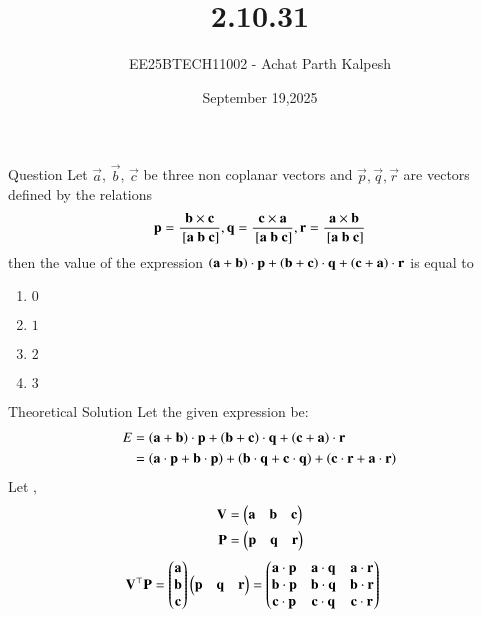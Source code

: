 \documentclass{beamer}
\title %
{2.10.31}
\date{September 19,2025}
\author %
{EE25BTECH11002 - Achat Parth Kalpesh}
\begin{document}
\frame{\titlepage}

\begin{frame}{Question}
Let $\vec{a}$, $\vec{b}$, $\vec{c}$ be three non coplanar vectors and 
$\vec{p}, \vec{q},\vec{r}$ are vectors defined by the relations 
\begin{align}
\vec{p}=\frac{\vec{b}\times\vec{c}}{\sbrak{\vec{a}\ \vec{b}\ \vec{c}}}, \vec{q}=\frac{\vec{c}\times\vec{a}}{\sbrak{\vec{a}\ \vec{b}\ \vec{c}}},\vec{r}=\frac{\vec{a}\times\vec{b}}{\sbrak{\vec{a}\ \vec{b}\ \vec{c}}}
\end{align}
then the value of the expression $\left(\mathbf{a}+\mathbf{b}\right)\cdot\mathbf{p}+\left(\mathbf{b}+\mathbf{c}\right)\cdot\mathbf{q}+\left(\mathbf{c}+\mathbf{a}\right)\cdot\mathbf{r}$ is equal to
  \begin{multicols}{2}
\begin{enumerate}
\item $0$
\item $1$
\item $2$
\item $3$
\end{enumerate}
\end{multicols}
\end{frame}
\begin{frame}{Theoretical Solution}
Let the given expression be:
\begin{align}
    E &= \left(\mathbf{a} + \mathbf{b}\right) \cdot \mathbf{p} + \left(\mathbf{b} + \mathbf{c}\right) \cdot \mathbf{q} + \left(\mathbf{c} + \mathbf{a}\right) \cdot \mathbf{r}\\
    &= \left(\mathbf{a} \cdot \mathbf{p} + \mathbf{b} \cdot \mathbf{p}\right) + \left(\mathbf{b} \cdot \mathbf{q} + \mathbf{c} \cdot \mathbf{q}\right) + \left(\mathbf{c} \cdot \mathbf{r} + \mathbf{a} \cdot \mathbf{r}\right)
\end{align}
Let ,
\begin{align}
    \mathbf{V} &= \begin{pmatrix}\mathbf{a}&\mathbf{b}&\mathbf{c}\end{pmatrix}\\
    \mathbf{P} &= \begin{pmatrix}\mathbf{p}&\mathbf{q}&\mathbf{r}\end{pmatrix}
\end{align}
\begin{align}
    \mathbf{V}^\top\mathbf{P} &= \begin{pmatrix}\mathbf{a}\\ \mathbf{b}\\ \mathbf{c}\end{pmatrix} \begin{pmatrix}\mathbf{p}&\mathbf{q}&\mathbf{r}\end{pmatrix} 
    = \begin{pmatrix}\mathbf{a} \cdot \mathbf{p} & \mathbf{a} \cdot \mathbf{q} & \mathbf{a} \cdot \mathbf{r} \\
        \mathbf{b} \cdot \mathbf{p} & \mathbf{b} \cdot \mathbf{q} & \mathbf{b} \cdot \mathbf{r} \\
        \mathbf{c} \cdot \mathbf{p} & \mathbf{c} \cdot \mathbf{q} & \mathbf{c} \cdot \mathbf{r}\end{pmatrix}
\end{align}

\end{frame}
\end{document}
